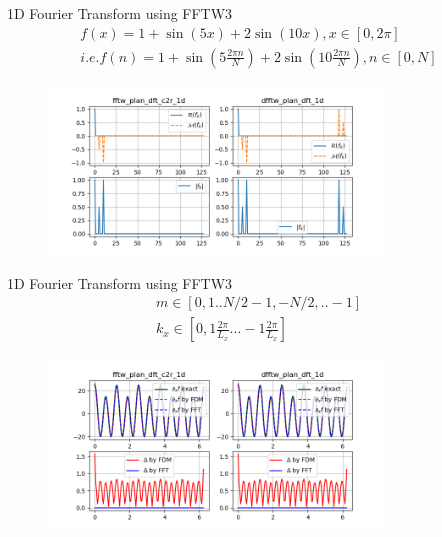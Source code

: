 \documentclass{beamer}
\begin{document}
\begin{frame}{1D Fourier Transform using FFTW3}
	\begin{equation}
		\begin{aligned}
			f(x)=1+\sin(5x)+2\sin(10x), x\in[0,2\pi] \\
			i.e. f(n)=1+\sin(5\frac{2\pi{n}}{N})+2\sin(10\frac{2\pi{n}}{N}), n\in[0,N]
		\end{aligned}
	\end{equation}
	
	\begin{figure}[H]
		\centering
		\includegraphics[width=0.8\textwidth]{./images/1d_k.png}
		\caption{}
	\end{figure}

\end{frame}

\begin{frame}{1D Fourier Transform using FFTW3}
	\begin{equation}
		\begin{aligned}
			m\in[0,1..N/2-1,-N/2,..-1] \\
			k_x\in[0,1\frac{2\pi}{L_x}...-1\frac{2\pi}{L_x}]
		\end{aligned}
	\end{equation}

	\begin{figure}[H]
		\centering
		\includegraphics[width=0.8\textwidth]{./images/1d_d.png}
		\caption{}
	\end{figure}

\end{frame}
\end{document}
